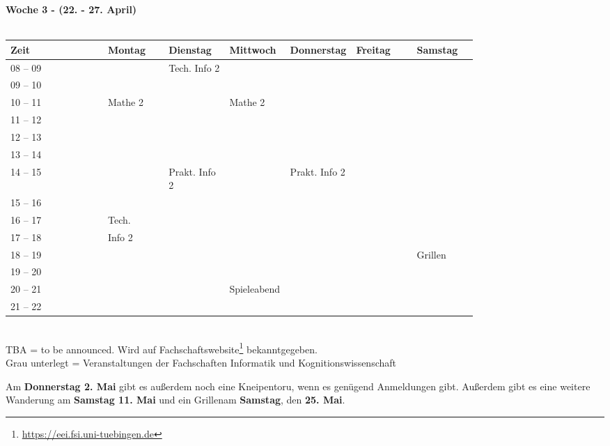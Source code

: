 \textbf{Woche 3 - (22. - 27. April)}\\
\\
\begin{tabular}{|l|p{0.13\linewidth}|p{0.13\linewidth}|p{0.13\linewidth}|p{0.13\linewidth}|p{0.13\linewidth}|p{0.13\linewidth}|} \hline
 Zeit & Montag & Dienstag & Mittwoch & Donnerstag & Freitag & Samstag \\ \hline \hline
 08 -- 09 & &\footnotesize{Tech. Info 2} & & & &\\ \cline{1-1}
 09 -- 10 & & & & & &  \\ \cline{1-1} \cline{3-3} \cline{2-2} \cline{4-4}
 10 -- 11 &\footnotesize{Mathe 2} & &\footnotesize{Mathe 2} & & & \\ \cline{1-1}
 11 -- 12 & & & & & &\\ \cline{1-1} \cline{2-2} \cline{4-4}
 12 -- 13 & & & & & & \\ \cline{1-1} 
 13 -- 14 & & & & & &  \\ \cline{1-1} \cline{3-3} \cline{5-5}
 14 -- 15 & &\footnotesize{Prakt. Info 2} & &\footnotesize{Prakt. Info 2} & &  \\ \cline{1-1}
 15 -- 16 & & & & & & \\ \cline {1-1} \cline{3-3} \cline{5-5} \cline{2-2}
 16 -- 17 & \footnotesize{Tech.}& & & & & \\ \cline{1-1}
 17 -- 18 &\footnotesize{Info 2} & & & & & \\ \cline{1-1}
 18 -- 19 & & & & & &\cellcolor{lightlightgray} \footnotesize{Grillen}  \\ \cline{1-2}
 19 -- 20 & & & & & &\cellcolor{lightlightgray} \\ \cline{1-1}
 20 -- 21 & & &\cellcolor{lightlightgray} \footnotesize{Spieleabend} & & &\cellcolor{lightlightgray} \\ \cline{1-1}
 21 -- 22 & & &\cellcolor{lightlightgray} & & &\cellcolor{lightlightgray} \\ \hline
\end{tabular}
\\
{\scriptsize TBA = to be announced. Wird auf Fachschaftswebsite\footnote{\url{https://eei.fsi.uni-tuebingen.de}}  bekanntgegeben.} \\
{\scriptsize Grau unterlegt = Veranstaltungen der Fachschaften Informatik und Kognitionswissenschaft }

\normalsize
Am \textbf{Donnerstag 2. Mai} gibt es außerdem noch eine Kneipentoru, wenn es genügend Anmeldungen gibt. Außerdem gibt es eine weitere Wanderung am \textbf{Samstag 11. Mai} und ein Grillenam \textbf{Samstag}, den \textbf{25. Mai}.

\newpage
\normalsize

